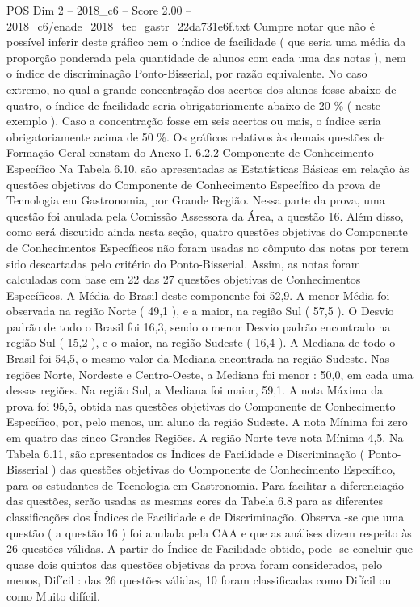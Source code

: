 \begin{textsample}{POS Dim 2 – 2018\_c6 – Score 2.00 – 2018\_c6/enade\_2018\_tec\_gastr\_22da731e6f.txt}
Cumpre notar que não é possível inferir deste gráfico nem o índice de facilidade ( que seria uma média da proporção ponderada pela quantidade de alunos com cada uma das notas ), nem o índice de discriminação Ponto-Bisserial, por razão equivalente.
No caso extremo, no qual a grande concentração dos acertos dos alunos fosse abaixo de quatro, o índice de facilidade seria obrigatoriamente abaixo de 20 \% ( neste exemplo ).
Caso a concentração fosse em seis acertos ou mais, o índice seria obrigatoriamente acima de 50 \%.
Os gráficos relativos às demais questões de Formação Geral constam do Anexo I. 6.2.2 Componente de Conhecimento Específico Na Tabela 6.10, são apresentadas as Estatísticas Básicas em relação às questões objetivas do Componente de Conhecimento Específico da prova de Tecnologia em Gastronomia, por Grande Região.
Nessa parte da prova, uma questão foi anulada pela Comissão Assessora da Área, a questão 16.
Além disso, como será discutido ainda nesta seção, quatro questões objetivas do Componente de Conhecimentos Específicos não foram usadas no cômputo das notas por terem sido descartadas pelo critério do Ponto-Bisserial.
Assim, as notas foram calculadas com base em 22 das 27 questões objetivas de Conhecimentos Específicos.
A Média do Brasil deste componente foi 52,9.
A menor Média foi observada na região Norte ( 49,1 ), e a maior, na região Sul ( 57,5 ).
O Desvio padrão de todo o Brasil foi 16,3, sendo o menor Desvio padrão encontrado na região Sul ( 15,2 ), e o maior, na região Sudeste ( 16,4 ).
A Mediana de todo o Brasil foi 54,5, o mesmo valor da Mediana encontrada na região Sudeste.
Nas regiões Norte, Nordeste e Centro-Oeste, a Mediana foi menor : 50,0, em cada uma dessas regiões.
Na região Sul, a Mediana foi maior, 59,1.
A nota Máxima da prova foi 95,5, obtida nas questões objetivas do Componente de Conhecimento Específico, por, pelo menos, um aluno da região Sudeste.
A nota Mínima foi zero em quatro das cinco Grandes Regiões.
A região Norte teve nota Mínima 4,5.
Na Tabela 6.11, são apresentados os Índices de Facilidade e Discriminação ( Ponto-Bisserial ) das questões objetivas do Componente de Conhecimento Específico, para os estudantes de Tecnologia em Gastronomia.
Para facilitar a diferenciação das questões, serão usadas as mesmas cores da Tabela 6.8 para as diferentes classificações dos Índices de Facilidade e de Discriminação.
Observa -se que uma questão ( a questão 16 ) foi anulada pela CAA e que as análises dizem respeito às 26 questões válidas.
A partir do Índice de Facilidade obtido, pode -se concluir que quase dois quintos das questões objetivas da prova foram considerados, pelo menos, Difícil : das 26 questões válidas, 10 foram classificadas como Difícil ou como Muito difícil.

\end{textsample}
